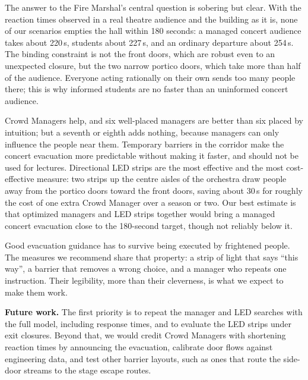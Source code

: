 \documentclass{article}
\begin{document}
The answer to the Fire Marshal's central question is sobering but clear. With the reaction times observed in a real theatre audience and the building as it is, none of our scenarios empties the hall within 180 seconds: a managed concert audience takes about 220\,s, students about 227\,s, and an ordinary departure about 254\,s. The binding constraint is not the front doors, which are robust even to an unexpected closure, but the two narrow portico doors, which take more than half of the audience. Everyone acting rationally on their own sends too many people there; this is why informed students are no faster than an uninformed concert audience.

Crowd Managers help, and six well-placed managers are better than six placed by intuition; but a seventh or eighth adds nothing, because managers can only influence the people near them. Temporary barriers in the corridor make the concert evacuation more predictable without making it faster, and should not be used for lectures. Directional LED strips are the most effective and the most cost-effective measure: two strips up the centre aisles of the orchestra draw people away from the portico doors toward the front doors, saving about 30\,s for roughly the cost of one extra Crowd Manager over a season or two. Our best estimate is that optimized managers and LED strips together would bring a managed concert evacuation close to the 180-second target, though not reliably below it.

Good evacuation guidance has to survive being executed by frightened people. The measures we recommend share that property: a strip of light that says ``this way'', a barrier that removes a wrong choice, and a manager who repeats one instruction. Their legibility, more than their cleverness, is what we expect to make them work.

\textbf{Future work.} The first priority is to repeat the manager and LED searches with the full model, including response times, and to evaluate the LED strips under exit closures. Beyond that, we would credit Crowd Managers with shortening reaction times by announcing the evacuation, calibrate door flows against engineering data, and test other barrier layouts, such as ones that route the side-door streams to the stage escape routes.
\end{document}
